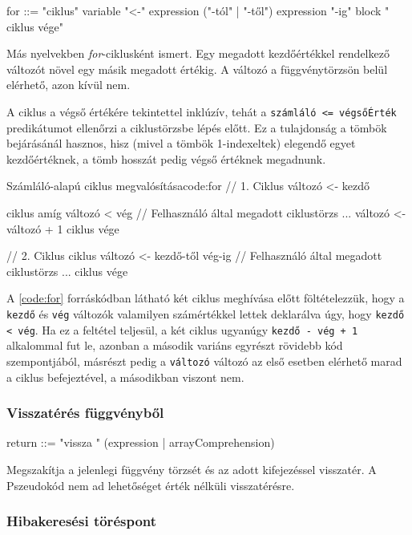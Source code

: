 \begin{ebnf}
for ::= "ciklus" variable "<-" expression ("-tól" | "-től") expression "-ig" block " ciklus vége"
\end{ebnf}

Más nyelvekben \textit{for}-ciklusként ismert. Egy megadott kezdőértékkel rendelkező változót növel egy másik megadott értékig. A változó a függvénytörzsön belül elérhető, azon kívül nem.

A ciklus a végső értékére tekintettel inklúzív, tehát a \texttt{számláló <= végsőÉrték} predikátumot ellenőrzi a ciklustörzsbe lépés előtt. Ez a tulajdonság a tömbök bejárásánál hasznos, hisz (mivel a tömbök 1-indexeltek) elegendő egyet kezdőértéknek, a tömb hosszát pedig végső értéknek megadnunk. 

\begin{code}{Számláló-alapú ciklus megvalósítása}{code:for}
// 1. Ciklus
változó <- kezdő

ciklus amíg változó < vég
    // Felhasználó által megadott ciklustörzs ...
    változó <- változó + 1
ciklus vége

// 2. Ciklus
ciklus változó <- kezdő-től vég-ig
    // Felhasználó által megadott ciklustörzs ...
ciklus vége
\end{code}

A \ref{code:for} forráskódban látható két ciklus meghívása előtt föltételezzük, hogy a \texttt{kezdő} és \texttt{vég} változók valamilyen számértékkel lettek deklarálva úgy, hogy \texttt{kezdő < vég}. Ha ez a feltétel teljesül, a két ciklus ugyanúgy \texttt{kezdő - vég + 1} alkalommal fut le, azonban a második variáns egyrészt rövidebb kód szempontjából, másrészt pedig a \texttt{változó} változó az első esetben elérhető marad a ciklus befejeztével, a másodikban viszont nem.

\subsubsection{Visszatérés függvényből}

\begin{ebnf}
return ::= "vissza " (expression | arrayComprehension) 
\end{ebnf}

Megszakítja a jelenlegi függvény törzsét és az adott kifejezéssel visszatér. A Pszeudokód nem ad lehetőséget érték nélküli visszatérésre.

\subsubsection{Hibakeresési töréspont}

